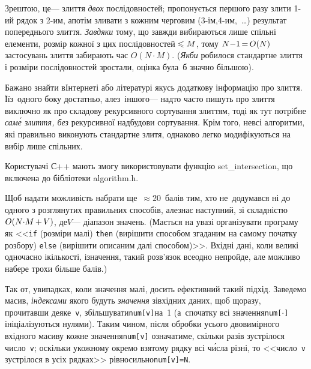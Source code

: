 Зрештою, це\nolinebreak[3] --- злиття \emph{двох} послідовностей; пропонується першого разу злити \mbox{1-ий} рядок з \mbox{2-им}, а\nolinebreak[3] потім зливати з кожним черговим (\mbox{3-ім},\nolinebreak[2] \mbox{4-им},~\dots) результат попереднього злиття. \emph{Завдяки} тому, що завжди вибираються лише спільні елементи, розмір кожної з цих послідовностей${}\leqslant M$, тому ${N{-}1}\dib{{=}}O(N)$ застосувань злиття забирають час $O(N{\cdot}M)$. (\emph{Якби} робилося стандартне злиття і розміри послідовностей зростали, оцінка була~б значно більшою).

Бажано знайти в\nolinebreak[3] Інтернеті або літературі якусь додаткову інформацію про злиття. Її\nolinebreak[2] з~одного боку достатньо, але\nolinebreak[2] з~іншого\nolinebreak[3] --- надто часто пишуть про злиття виключно як про складову рекурсивного сортування злиттям, тоді як тут потрібне \emph{сам\'{е} злиття, без} рекурсивної надбудови сортування. Крім того, не\nolinebreak[3] всі алгоритми, які правильно виконують стандартне злитя, однаково легко модифікуються на вибір лише спільних.

Користувачі С++ мають змогу використовувати функцію  set\_intersection, що включена до бібліотеки algorithm.h.

Щоб надати можливість набрати ще~${\approx}20$~балів тим, хто не~додумався ні до одного з розглянутих правильних способів, але\nolinebreak[3] знає наступний, зі складністю $O(N{\cdot}M\dib{{+}}V)$, де\nolinebreak[3] $V$\nolinebreak[3] --- діапазон значень. (Мається на увазі організувати програму як <<\texttt{if} (розміри малі) \texttt{then} (вирішити способом згаданим на самому початку розбору) \texttt{else} (вирішити описаним далі способом)>>. Вхідні дані, коли великі одночасно і\nolinebreak[3] кількості, і\nolinebreak[3] значення, такий розв'язок все\nolinebreak[3] одно не\nolinebreak[3] пройде, але можливо набере трохи більше балів.)

Так от, у\nolinebreak[3] випадках, коли значення малі, досить ефективний такий підхід. Заведемо масив, \emph{індексами} якого будуть \emph{значення} зі\nolinebreak[3] вхідних даних, щоб щоразу, прочитавши деяке~\texttt{v}, збільшувати\nolinebreak[2] \texttt{num[v]}\nolinebreak[2] на~1 (а~спочатку всі значення\nolinebreak[3] \texttt{num[$\cdot$]} ініціалізуються нулями). Таким чином, після обробки усього двовимірного вхідного масиву кожне значення\nolinebreak[2] \texttt{num[v]} означатиме, скільки разів зустрілося число~\texttt{v}; оскільки у\nolinebreak[3] кожному окремо взятому рядку всі ч\'{и}сла різні, то <<число~\texttt{v} зустрілося в усіх рядках>> рівносильно\nolinebreak[1] \mbox{\texttt{num[v]=N}}.


